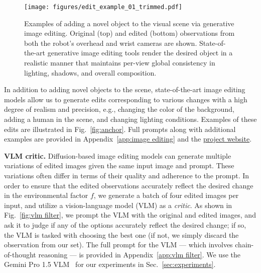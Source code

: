 \begin{figure}[t]
    \centering
    \texttt{[image: figures/edit\_example\_01\_trimmed.pdf]}
    \caption{Examples of adding a novel object to the visual scene via generative image editing. Original (top) and edited (bottom) observations from both the robot's overhead and wrist cameras are shown. State-of-the-art generative image editing tools render the desired object in a realistic manner that maintains per-view global consistency in lighting, shadows, and overall composition.}
    \label{fig:distractor edit}
\end{figure}


In addition to adding novel objects to the scene, state-of-the-art image editing models allow us to generate edits corresponding to various changes with a high degree of realism and precision, e.g., changing the color of the background, adding a human in the scene, and changing lighting conditions. Examples of these edits are illustrated in Fig.~\ref{fig:anchor}. Full prompts along with additional examples are provided in Appendix~\ref{app:image editing} and the \href{https://predictive-red-team.github.io/}{project website}.

{\bf VLM critic.} Diffusion-based image editing models can generate multiple variations of edited images given the same input image and prompt. These variations often differ in terms of their quality and adherence to the prompt. In order to ensure that the edited observations accurately reflect the desired change in the environmental factor $f$, we generate a batch of four edited images per input, and utilize a vision-language model (VLM) as a \emph{critic}. As shown in Fig.~\ref{fig:vlm filter}, we prompt the VLM with the original and edited images, and ask it to judge if any of the options accurately reflect the desired change; if so, the VLM is tasked with choosing the best one (if not, we simply discard the observation from our set). The full prompt for the VLM --- which involves chain-of-thought reasoning --- is provided in Appendix~\ref{app:vlm filter}. We use the Gemini Pro 1.5 VLM~\cite{team2023gemini} for our experiments in Sec.~\ref{sec:experiments}.  

